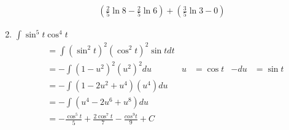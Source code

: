 \documentclass[12pt]{article}
\begin{document}
\begin{enumerate}
\begin{align*}
             \left(\frac{2}{5}\ln{8} - \frac{2}{5}\ln{6}\right) + \left(\frac{3}{5}\ln{3}-0\right) 
         \end{align*}
    \addtocounter{enumi}{3}\item $\int\sin^5{t}\cos^4t$
        \begin{align*}
            &=\int (\sin^2t)^2(\cos^2t)^2\sin{t}dt \\
            &= -\int (1-u^2)^2(u^2)^2du &u &= \cos{t} &-du &= \sin{t}\\
            &=-\int (1-2u^2+u^4)(u^4)du \\
            &=-\int (u^4-2u^6+u^8)du \\
            &=-\frac{\cos^5t}{5}+\frac{2\cos^7t}{7}-\frac{cos^9t}{9}+C
        \end{align*}
    

\end{enumerate}
\end{document}
